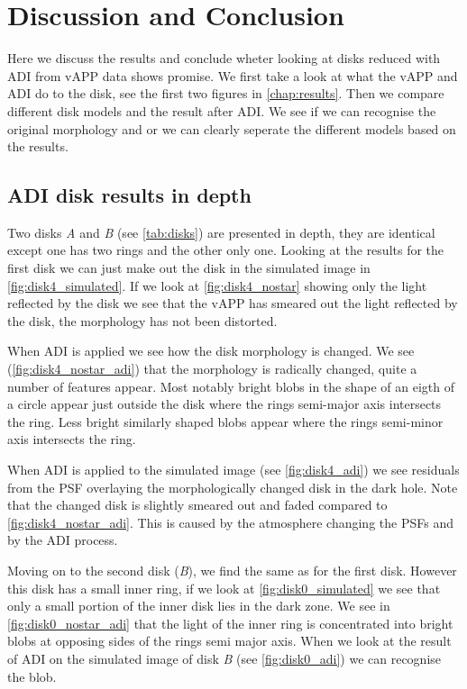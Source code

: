 \chapter{Discussion and Conclusion}

Here we discuss the results and conclude wheter looking at disks reduced with \ac{ADI} from \ac{vAPP} data shows promise. We first take a look at what the \ac{vAPP} and \ac{ADI} do to the disk, see the first two figures in \autoref{chap:results}. Then we compare different disk models and the result after \ac{ADI}. We see if we can recognise the original morphology and or we can clearly seperate the different models based on the results. 

\section{ADI disk results in depth}
\label{sec:adi_res}
Two disks \textit{A} and \textit{B} (see \autoref{tab:disks}) are presented in depth, they are identical except one has two rings and the other only one. Looking at the results for the first disk we can just make out the disk in the simulated image in \autoref{fig:disk4_simulated}. If we look at \autoref{fig:disk4_nostar} showing only the light reflected by the disk we see that the \ac{vAPP} has smeared out the light reflected by the disk, the morphology has not been distorted. 

When \ac{ADI} is applied we see how the disk morphology is changed. We see (\autoref{fig:disk4_nostar_adi}) that the morphology is radically changed, quite a number of features appear. Most notably bright blobs in the shape of an eigth of a circle appear just outside the disk where the rings semi-major axis intersects the ring. Less bright similarly shaped blobs appear where the rings semi-minor axis intersects the ring.

When \ac{ADI} is applied to the simulated image (see \autoref{fig:disk4_adi}) we see residuals from the \ac{PSF} overlaying the morphologically changed disk in the dark hole. Note that the changed disk is slightly smeared out and faded compared to \autoref{fig:disk4_nostar_adi}. This is caused by the atmosphere changing the \acp{PSF} and by the \ac{ADI} process.

Moving on to the second disk (\textit{B}), we find the same as for the first disk. However this disk has a small inner ring, if we look at \autoref{fig:disk0_simulated} we see that only a small portion of the inner disk lies in the dark zone. We see in \autoref{fig:disk0_nostar_adi} that the light of the inner ring is concentrated into bright blobs at opposing sides of the rings semi major axis. When we look at the result of \ac{ADI} on the simulated image of disk \textit{B} (see \autoref{fig:disk0_adi}) we can recognise the blob. 

